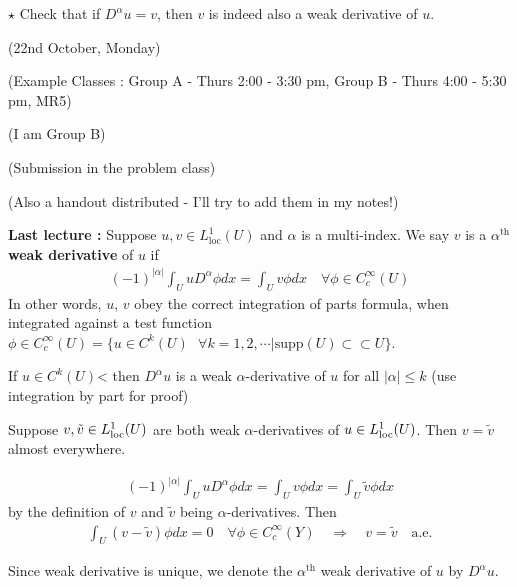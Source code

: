 \documentclass[12pt,a4paper]{report}
\newenvironment{proof}
{\begin{changemargin}{1cm}{0.5cm} 
	}%
	{\end{changemargin}
}
\begin{document}
$\star$ Check that if $D^{\alpha} u = v$, then $v$ is indeed also a weak derivative of $u$.
\s

\newday

(22nd October, Monday)
\s

(Example Classes : Group A - Thurs 2:00 - 3:30 pm, Group B - Thurs 4:00 - 5:30 pm, MR5)

(I am Group B)

(Submission in the problem class)

(Also a handout distributed - I'll try to add them in my notes!)
\s

\textbf{Last lecture :} Suppose $u,v\in L^1_{\text{loc}}(U)$ and $\alpha$ is a multi-index. We say $v$ is a \textbf{$\alpha^{\text{th}}$ weak derivative} of $u$ if
\begin{align*}
(-1)^{|\alpha|} \int_{U} uD^{\alpha} \phi dx = \int_U v\phi dx \quad \forall \phi \in C^{\infty}_c(U)
\end{align*}
In other words, $u$, $v$ obey the correct integration of parts formula, when integrated against a test function $\phi \in C^{\infty}_c(U) = \{u\in C^k(U) \,\,\,\, \forall k=1,2,\cdots | \text{supp}(U) \subset \subset U \}$.
\s

If $u\in C^k(U)$< then $D^{\alpha} u$ is a weak $\alpha$-derivative of $u$ for all $|\alpha| \leq k$ (use integration by part for proof)
\s

\lem Suppose $v,\tilde{v} \in L^1_{\text{loc}} (U)$ are both weak $\alpha$-derivatives of $u\in L^1_{\text{loc}} (U)$. Then $v= \tilde{v}$ almost everywhere.
\begin{proof}
\pf \begin{align*}
(-1)^{|\alpha|} \int_U uD^{\alpha} \phi dx = \int_U v \phi dx = \int_U \tilde{v} \phi dx
\end{align*}
by the definition of $v$ and $\tilde{v}$ being $\alpha$-derivatives. Then
\begin{align*}
\int_U (v-\tilde{v}) \phi dx =0 \quad \forall \phi \in C^{\infty}_c (Y) \quad \Rightarrow \quad v= \tilde{v} \quad \text{a.e.}
\end{align*}

\eop
\end{proof}
\s

Since weak derivative is unique, we denote the $\alpha^{\text{th}}$ weak derivative of $u$ by $D^{\alpha} u$.
\end{document}
